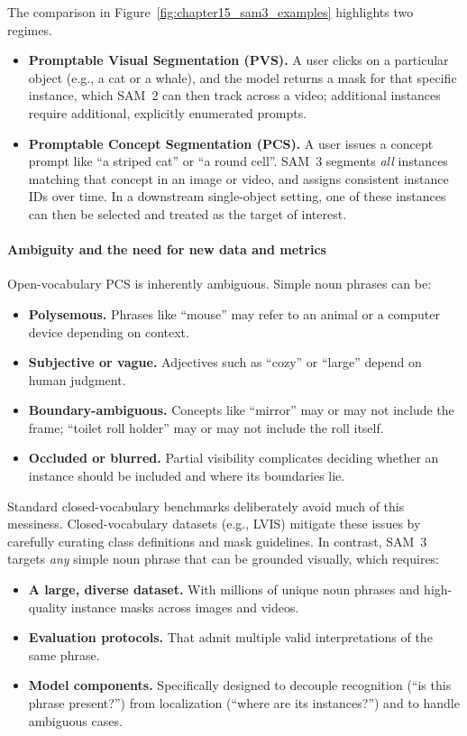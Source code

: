 \begin{enrichment}
\begin{enrichment}
		The comparison in Figure~\ref{fig:chapter15_sam3_examples} highlights two regimes.
		\begin{itemize}
			\item \textbf{Promptable Visual Segmentation (PVS).} A user clicks on a particular object (e.g., a cat or a whale), and the model returns a mask for that specific instance, which SAM~2 can then track across a video; additional instances require additional, explicitly enumerated prompts.
			\item \textbf{Promptable Concept Segmentation (PCS).} A user issues a concept prompt like ``a striped cat'' or ``a round cell''. SAM~3 segments \emph{all} instances matching that concept in an image or video, and assigns consistent instance IDs over time. In a downstream single-object setting, one of these instances can then be selected and treated as the target of interest.
		\end{itemize}
		
		\paragraph{Ambiguity and the need for new data and metrics}
		
		Open-vocabulary PCS is inherently ambiguous. Simple noun phrases can be:
		\begin{itemize}
			\item \textbf{Polysemous.} Phrases like ``mouse'' may refer to an animal or a computer device depending on context.
			\item \textbf{Subjective or vague.} Adjectives such as ``cozy'' or ``large'' depend on human judgment.
			\item \textbf{Boundary-ambiguous.} Concepts like ``mirror'' may or may not include the frame; ``toilet roll holder'' may or may not include the roll itself.
			\item \textbf{Occluded or blurred.} Partial visibility complicates deciding whether an instance should be included and where its boundaries lie.
		\end{itemize}
		Standard closed-vocabulary benchmarks deliberately avoid much of this messiness. Closed-vocabulary datasets (e.g., LVIS) mitigate these issues by carefully curating class definitions and mask guidelines. In contrast, SAM~3 targets \emph{any} simple noun phrase that can be grounded visually, which requires:
		
		\begin{itemize}
			\item \textbf{A large, diverse dataset.} With millions of unique noun phrases and high-quality instance masks across images and videos.
			\item \textbf{Evaluation protocols.} That admit multiple valid interpretations of the same phrase.
			\item \textbf{Model components.} Specifically designed to decouple recognition (``is this phrase present?'') from localization (``where are its instances?'') and to handle ambiguous cases.
		\end{itemize}
		

\end{enrichment}
\end{enrichment}
